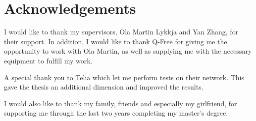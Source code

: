 
\vspace*{2cm}
\thispagestyle{plain}

\section*{Acknowledgements} \label{section:acknowledgements}

I would like to thank my supervisors, Ola Martin Lykkja and Yan Zhang, for their support. In addition, I would like to thank Q-Free for giving me the opportunity to work with Ola Martin, as well as supplying me with the necessary equipment to fulfill my work.

A special thank you to Telia which let me perform tests on their network. This gave the thesis an additional dimension and improved the results.

I would also like to thank my family, friends and especially my girlfriend, for supporting me through the last two years completing my master's degree.
